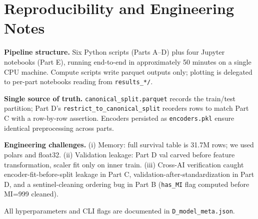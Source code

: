 \documentclass[11pt,a4paper]{article}
\begin{document}
\section{Reproducibility and Engineering Notes}

\textbf{Pipeline structure.} Six Python scripts (Parts A--D) plus four Jupyter notebooks (Part E), running end-to-end in approximately 50 minutes on a single CPU machine. Compute scripts write parquet outputs only; plotting is delegated to per-part notebooks reading from \texttt{results\_*/}.

\textbf{Single source of truth.} \texttt{canonical\_split.parquet} records the train/test partition; Part D's \texttt{restrict\_to\_canonical\_split} reorders rows to match Part C with a row-by-row assertion. Encoders persisted as \texttt{encoders.pkl} ensure identical preprocessing across parts.

\textbf{Engineering challenges.} (i) Memory: full survival table is 31.7M rows; we used polars and float32. (ii) Validation leakage: Part D val carved before feature transformation, scaler fit only on inner train. (iii) Cross-AI verification caught encoder-fit-before-split leakage in Part C, validation-after-standardization in Part D, and a sentinel-cleaning ordering bug in Part B (\texttt{has\_MI} flag computed before MI=999 cleaned).

All hyperparameters and CLI flags are documented in \texttt{D\_model\_meta.json}.
\end{document}

